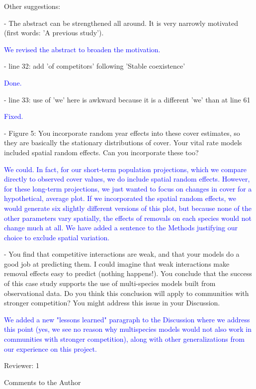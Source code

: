\documentclass[12pt]{article}
\newcommand{\response}{\textcolor{blue}}
\begin{document}
Other suggestions:

- The abstract can be strengthened all around. It is very narrowly motivated (first words: 'A previous study').

\response{We revised the abstract to broaden the motivation.}

- line 32: add 'of competitors' following 'Stable coexistence'

\response{Done.}

- line 33: use of 'we' here is awkward because it is a different 'we' than at line 61

\response{Fixed.}

- Figure 5: You incorporate random year effects into these cover estimates, so they are basically the stationary distributions of cover. Your vital rate models included spatial random effects. Can you incorporate these too?

\response{We could. In fact, for our short-term population projections, which we compare directly to observed cover values, we do include spatial random effects. However, for these long-term projections, we just wanted to focus on changes in cover for a hypothetical, average plot. If we incorporated the spatial random effects, we would generate six slightly different versions of this plot, but because none of the other parameters vary spatially, the effects of removals on each species would not change much at all. We have added a sentence to the Methods justifying our choice to exclude spatial variation. }

- You find that competitive interactions are weak, and that your models do a good job at predicting them. I could imagine that weak interactions make removal effects easy to predict (nothing happens!). You conclude that the success of this case study supports the use of multi-species models built from observational data. Do you think this conclusion will apply to communities with stronger competition? You might address this issue in your Discussion.

\response{We added a new "lessons learned" paragraph to the Discussion where we address this point (yes, we see no reason why
multispecies models would not also work in communities with stronger competition), along with other generalizations 
from our experience on this project.  }

Reviewer: 1

Comments to the Author
\end{document}
